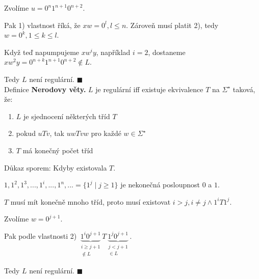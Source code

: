Zvolíme $u = 0^n 1^{n+1} 0^{n+2}$.

Pak 1) vlastnost říká, že $xw = 0^l, l \leq n$. Zároveň musí platit 2), tedy $w = 0^k, 1 \leq k \leq l$.

Když teď napumpujeme $xw^i y$, například $i=2$, dostaneme $xw^2 y = 0^{n+k} 1^{n+1} 0^{n+2} \not\in L$.

Tedy $L$ není regulární. $\blacksquare$\\

\noindent
Definice \textbf{Nerodovy věty.} $L$ je regulární iff existuje ekvivalence $T$ na $\Sigma^\star$ taková, že:
\begin{enumerate}[1), noitemsep]
    \item $L$ je sjednocení některých tříd $T$
    \item pokud $uTv$, tak $uwTvw$ pro každé $w \in \Sigma^\star$
    \item $T$ má konečný počet tříd
\end{enumerate}
Důkaz sporem:
Kdyby existovala $T$.

$1, 1^2, 1^3, ..., 1^i, ..., 1^n, ... = \{1^j \mid j \geq 1\}$ je nekonečná posloupnost $0$ a $1$.

$T$ musí mít konečně mnoho tříd, proto musí existovat $i > j, i \not= j \land 1^i T 1^j$.

Zvolíme $w = 0^{j + 1}$.

Pak podle vlastnosti 2) $\underbrace{1^i 0^{j+1}}_{\substack{i \geq j+1 \\ \not\in L}} T
\underbrace{1^j 0^{j+1}}_{\substack{j < j+1 \\\in L }}$.

Tedy $L$ není regulární. $\blacksquare$